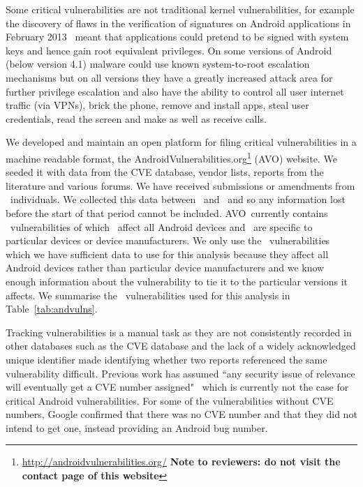 \documentclass[conference,a4paper,twoside]{IEEEtran}
\let\OldTodo\todo
\renewcommand{\todo}{\OldTodo[inline]}
\newcommand{\todolater}[1]{}%
\newcommand{\avo}{AVO}
\begin{document}
Some critical vulnerabilities are not traditional kernel vulnerabilities, for example the discovery of flaws in the verification of signatures on Android applications in February 2013~\cite{Forristal2013} meant that applications could pretend to be signed with system keys and hence gain root equivalent privileges.
On some versions of Android (below version 4.1) malware could use known system-to-root escalation mechanisms but on all versions they have a greatly increased attack area for further privilege escalation and also have the ability to control all user internet traffic (via VPNs), brick the phone, remove and install apps, steal user credentials, read the screen and make as well as receive calls.
\todolater{break vulnerabilities down by attack vector?}
\avoTabAndVulns

We developed and maintain an open platform for filing critical vulnerabilities in a machine readable format, the AndroidVulnerabilities.org\footnote{\url{http://androidvulnerabilities.org/} \textbf{Note to reviewers: do not visit the contact page of this website}} (\avo) website.
We seeded it with data from the CVE database, vendor lists, reports from the literature and various forums.
We have received submissions or amendments from \avoNumSubmitters\ individuals.
We collected this data between \avoStartDate\ and \avoEndDate\ and so any information lost before the start of that period cannot be included.
\avo\ currently contains \avoNumVulnerabilities\ vulnerabilities of which \avoNumVulnAllAndroid\ affect all Android devices and \avoNumVulnSpecific\ are specific to particular devices or device manufacturers.
We only use the \daNumVulnsUsed\ vulnerabilities which we have sufficient data to use for this analysis because they affect all Android devices rather than particular device manufacturers and we know enough information about the vulnerability to tie it to the particular versions it affects.
We summarise the \daNumVulnsUsed\ vulnerabilities used for this analysis in Table~\ref{tab:andvulns}.\todolater{We have published full details of the \daNumVulnsUsed\ vulnerabilities used for this analysis in an accompanying technical report~\cite{TODO}}


Tracking vulnerabilities is a manual task as they are not consistently recorded in other databases such as the CVE database and the lack of a widely acknowledged unique identifier made identifying whether two reports referenced the same vulnerability difficult.
Previous work has assumed ``any security issue of relevance will eventually get a CVE number assigned"~\cite{Frei2010} which is currently not the case for critical Android vulnerabilities.
For some of the vulnerabilities without CVE numbers, Google confirmed that there was no CVE number and that they did not intend to get one, instead providing an Android bug number.
\end{document}
